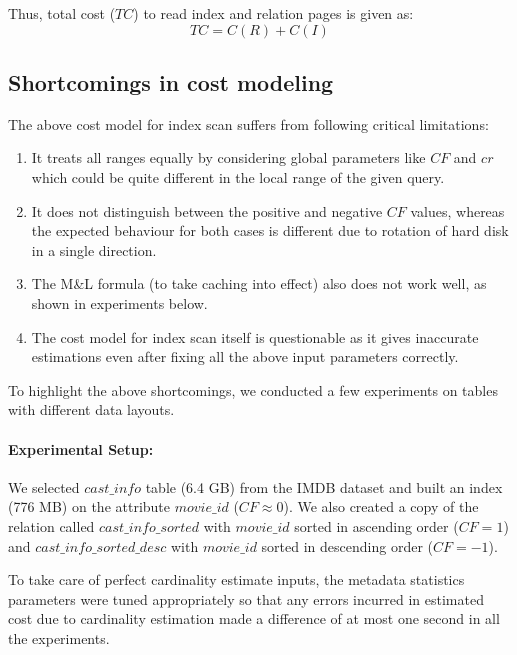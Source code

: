 \documentclass{article}
\begin{document}
\begin{multicols}{2}
	Thus, total cost ($TC$) to read index and relation pages is given as:
	\[TC = C(R) + C(I)\]
	
	
	\subsection*{Shortcomings in cost modeling}
	
	The above cost model for index scan suffers from following critical limitations:
	\begin{enumerate}
		\item It treats all ranges equally by considering global parameters like $CF$ and $cr$ which could be quite different in the local range of the given query.
		\item It does not distinguish between the positive and negative $CF$ values, whereas the expected behaviour for both cases is different due to rotation of hard disk in a single direction.
		\item  The M\&L formula (to take caching into effect) also does not work well, as shown in experiments below.
		\item The cost model for index scan itself is questionable as it gives inaccurate estimations even after fixing all the above input parameters correctly.
	\end{enumerate}

	To highlight the above shortcomings, we conducted a few experiments on tables with different data layouts.
	\paragraph{Experimental Setup:}
	
	We selected $cast\_info$ table (6.4 GB) from the IMDB dataset and built an index (776 MB) on the attribute $movie\_id$ ($CF \approx 0$). We also created a copy of the relation called $cast\_info\_sorted$ with $movie\_id$ sorted in ascending order ($CF = 1$) and $cast\_info\_sorted\_desc$ with $movie\_id$ sorted in descending order ($CF = -1$).
	
	To take care of perfect cardinality estimate inputs, the metadata statistics parameters were tuned appropriately so that any errors incurred in estimated cost due to cardinality estimation made a difference of at most one second in all the experiments.
	

\end{multicols}
\end{document}
